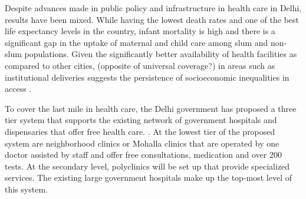 Despite advances made in public policy and infrastructure in health care in Delhi, results have been mixed. While having the lowest death rates and one of the best life expectancy levels in the country, infant mortality is high and there is a significant gap in the uptake of maternal and child care among slum and non-slum populations. Given the significantly better availability of health facilities as compared to other cities, (opposite of universal coverage?) in areas such as institutional deliveries suggests the persistence of socioeconomic inequalities in access \cite{mazumdar2015health}.

To cover the last mile in health care, the Delhi government has proposed a three tier system that supports the existing network of government hospitals and dispensaries that offer free health care. \cite{article}. At the lowest tier of the proposed system are neighborhood clinics or Mohalla clinics that are operated by one doctor assisted by staff and offer free consultations, medication and over 200 tests. At the secondary level, polyclinics will be set up that provide specialized services. The existing large government hospitals make up the top-most level of this system.




